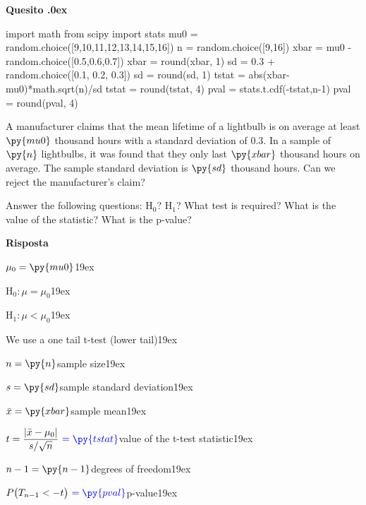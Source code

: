 \documentclass[11pt,twoside,a4paper]{article}
\newcounter{quesito}
\newenvironment{question}{\bigskip\addtocounter{quesito}{1}\bigskip\bigskip\par\textbf{Quesito \thequesito.\kern0ex}}{\par\vspace{\parskip}}
\newenvironment{answer}{\par\textbf{Risposta\quad}}{\par\vspace{\parskip}}
\begin{document}
\begin{question}
\begin{pycode}
import math
from scipy import stats
mu0 = random.choice([9,10,11,12,13,14,15,16])
n = random.choice([9,16])
xbar = mu0 - random.choice([0.5,0.6,0.7])
xbar = round(xbar, 1)
sd = 0.3 + random.choice([0.1, 0.2, 0.3])
sd = round(sd, 1)
tstat = abs(xbar-mu0)*math.sqrt(n)/sd
tstat = round(tstat, 4)
pval = stats.t.cdf(-tstat,n-1)
pval = round(pval, 4)
\end{pycode}
A manufacturer claims that the mean lifetime of a lightbulb is on average at least $\py{mu0}$ thousand  hours with a standard deviation of $0.3$. In a sample of $\py{n}$ lightbulbs, it was found that they only last $\py{xbar}$ thousand hours on average. The sample standard deviation is $\py{sd}$ thousand hours. Can we reject the manufacturer's claim? 

Answer the following questions: H$_0$? H$_1$? What test is required? What is the value of the statistic? What is the p-value? 

\begin{answer}\parskip5pt

  $\mu_0 = \py{mu0}$\kern19ex

  H$_0:$\hfill $\mu = \mu_0$\kern19ex
  
  H$_1:$\hfill $\mu<\mu_0$\kern19ex
  
  We use a one tail t-test (lower tail)\kern19ex
  
  $n = \py{n}$\hfill sample size\kern19ex
  
  $s = \py{sd}$\hfill sample standard deviation\kern19ex
  
  $\bar{x} = \py{xbar}$\hfill sample mean\kern19ex
  
  $t = \displaystyle\frac{|\bar{x}-\mu_0|}{s/\sqrt{n}}\  {\color{blue}= \py{tstat}}$\hfill value of the t-test statistic\kern19ex
  
  $n-1 = \py{n-1}$\hfill degrees of freedom\kern19ex
  
  $P\big(T_{n-1}<-t\big)\  {\color{blue}= \py{pval}}$\hfill p-value\kern19ex

\end{answer}
\end{question}
\end{document}

